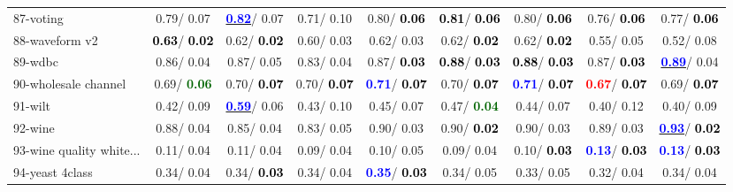 \begin{table}[h]
\begin{center}
\begin{tabular}{lc|c|c|c|c|c|c|c}
87-voting &   0.79/  0.07 & \underline{\textcolor{blue}{\textbf{  0.82}}}/  0.07 &   0.71/  0.10 &   0.80/\textcolor{black}{\textbf{  0.06}} & \textcolor{black}{\textbf{  0.81}}/\textcolor{black}{\textbf{  0.06}} &   0.80/\textcolor{black}{\textbf{  0.06}} &   0.76/\textcolor{black}{\textbf{  0.06}} &   0.77/\textcolor{black}{\textbf{  0.06}} \\
88-waveform v2 & \textcolor{black}{\textbf{  0.63}}/\textcolor{black}{\textbf{  0.02}} &   0.62/\textcolor{black}{\textbf{  0.02}} &   0.60/  0.03 &   0.62/  0.03 &   0.62/\textcolor{black}{\textbf{  0.02}} &   0.62/\textcolor{black}{\textbf{  0.02}} &   0.55/  0.05 &   0.52/  0.08 \\
89-wdbc &   0.86/  0.04 &   0.87/  0.05 &   0.83/  0.04 &   0.87/\textcolor{black}{\textbf{  0.03}} & \textcolor{black}{\textbf{  0.88}}/\textcolor{black}{\textbf{  0.03}} & \textcolor{black}{\textbf{  0.88}}/\textcolor{black}{\textbf{  0.03}} &   0.87/\textcolor{black}{\textbf{  0.03}} & \underline{\textcolor{blue}{\textbf{  0.89}}}/  0.04 \\
90-wholesale channel &   0.69/\textcolor{darkgreen}{\textbf{  0.06}} &   0.70/\textcolor{black}{\textbf{  0.07}} &   0.70/\textcolor{black}{\textbf{  0.07}} & \textcolor{blue}{\textbf{  0.71}}/\textcolor{black}{\textbf{  0.07}} &   0.70/\textcolor{black}{\textbf{  0.07}} & \textcolor{blue}{\textbf{  0.71}}/\textcolor{black}{\textbf{  0.07}} & \textcolor{red}{\textbf{  0.67}}/\textcolor{black}{\textbf{  0.07}} &   0.69/\textcolor{black}{\textbf{  0.07}} \\
91-wilt &   0.42/  0.09 & \underline{\textcolor{blue}{\textbf{  0.59}}}/  0.06 &   0.43/  0.10 &   0.45/  0.07 &   0.47/\textcolor{darkgreen}{\textbf{  0.04}} &   0.44/  0.07 &   0.40/  0.12 &   0.40/  0.09 \\
92-wine &   0.88/  0.04 &   0.85/  0.04 &   0.83/  0.05 &   0.90/  0.03 &   0.90/\textcolor{black}{\textbf{  0.02}} &   0.90/  0.03 &   0.89/  0.03 & \underline{\textcolor{blue}{\textbf{  0.93}}}/\textcolor{black}{\textbf{  0.02}} \\ \hline
93-wine quality white... &   0.11/  0.04 &   0.11/  0.04 &   0.09/  0.04 &   0.10/  0.05 &   0.09/  0.04 &   0.10/\textcolor{black}{\textbf{  0.03}} & \textcolor{blue}{\textbf{  0.13}}/\textcolor{black}{\textbf{  0.03}} & \textcolor{blue}{\textbf{  0.13}}/\textcolor{black}{\textbf{  0.03}} \\
94-yeast 4class &   0.34/  0.04 &   0.34/\textcolor{black}{\textbf{  0.03}} &   0.34/  0.04 & \textcolor{blue}{\textbf{  0.35}}/\textcolor{black}{\textbf{  0.03}} &   0.34/  0.05 &   0.33/  0.05 &   0.32/  0.04 &   0.34/  0.04 \\\end{tabular}\label{stratsALCKappa2bSVMRedux}
\end{center}
\end{table}